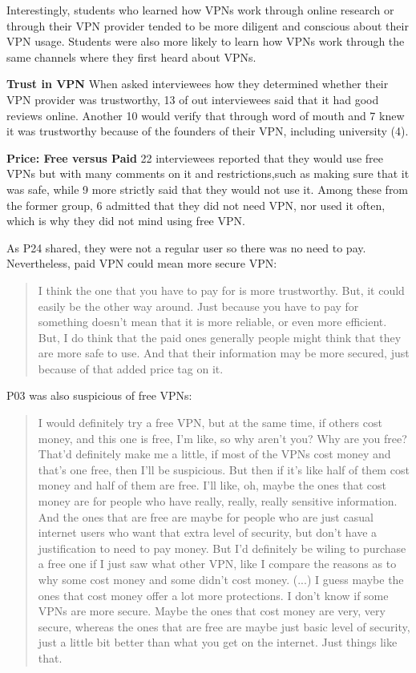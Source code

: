 Interestingly, students who learned how VPNs work through online research or
through their VPN provider tended to be more diligent and conscious about
their VPN usage. Students were also more likely to learn how VPNs work through
the same channels where they first heard about VPNs.

\textbf{Trust in VPN} When asked interviewees how they determined whether
their VPN provider was trustworthy, 13 of out interviewees said that it had
good reviews online. Another 10 would verify that through word of mouth and 7
knew it was trustworthy because of the founders of their VPN, including
university (4). 

\textbf{Price: Free versus Paid} 22 interviewees reported that they would use free VPNs but with
many comments on it and restrictions,such as making sure that it was safe,
while 9 more strictly said that they would not use it. Among these from the
former group, 6 admitted that they did not need VPN, nor used it often, which
is why they did not mind using free VPN. 

As P24 shared, they were not a regular user so there was no need to pay.
Nevertheless, paid VPN could mean more secure VPN: \begin{quote} I think the
one that you have to pay for is more trustworthy. But, it could easily be the
other way around. Just because you have to pay for something doesn't mean that
it is more reliable, or even more efficient. But, I do think that the paid
ones generally people might think that they are more safe to use. And that
their information may be more secured, just because of that added price tag on
it.\end{quote}

P03 was also suspicious of free VPNs: \begin{quote}I would definitely try a
free VPN, but at the same time, if others cost money, and this one is free,
I'm like, so why aren't you? Why are you free? That'd definitely make me a
little, if most of the VPNs cost money and that's one free, then I'll be
suspicious. But then if it's like half of them cost money and half of them are
free. I'll like, oh, maybe the ones that cost money are for people who have
really, really, really sensitive information. And the ones that are free are
maybe for people who are just casual internet users who want that extra level
of security, but don't have a justification to need to pay money. But I'd
definitely be wiling to purchase a free one if I just saw what other VPN, like
I compare the reasons as to why some cost money and some didn't cost money.
(...) I guess maybe the ones that cost money offer a lot more protections. I
don't know if some VPNs are more secure. Maybe the ones that cost money are
very, very secure, whereas the ones that are free are maybe just basic level
of security, just a little bit better than what you get on the internet. Just
things like that.\end{quote}

